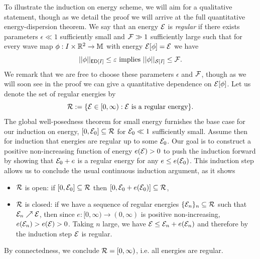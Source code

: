 To illustrate the induction on energy scheme, we will aim for a qualitative statement, though as we detail the proof we will arrive at the full quantitative energy-dispersion theorem. We say that an energy $\mathcal E$ is \emph{regular} if there exists parameters $\epsilon \ll 1$ sufficiently small and $\mathcal F \gg 1$ sufficiently large such that for every wave map $\phi : I \times \mathbb R^2 \to \mathbb M$ with energy $\mathcal E [\phi] = \mathcal E$ we have
	\[ ||\phi||_{\mathsf{ED} [I]} \leq \varepsilon \text{ implies } || \phi||_{\mathcal S[I]} \leq \mathcal F. \]
We remark that we are free to choose these parameters $\epsilon$ and $\mathcal F$, though as we will soon see in the proof we can give a quantitative dependence on $\mathcal E[\phi]$. Let us denote the set of regular energies by 
	\[ \mathcal R := \{ \mathcal E \in [0, \infty) : \text{$\mathcal E$ is a regular energy} \}. \]
The global well-posedness theorem for small energy furnishes the base case for our induction on energy, $[0, \mathcal E_0] \subseteq \mathcal R$ for $\mathcal E_0 \ll 1$ sufficiently small. Assume then for induction that energies are regular up to some $\mathcal E_0$. Our goal is to construct a positive non-increasing function of energy $e (\mathcal E) > 0$ to push the induction forward by showing that $\mathcal E_0 + e$ is a regular energy for any $e \leq e (\mathcal E_0)$. This induction step allows us to conclude the usual continuous induction argument, as it shows
	\begin{itemize}
		\item $\mathcal R$ is open: if $[0, \mathcal E_0] \subseteq \mathcal R$ then $[0, \mathcal E_0 + e(\mathcal E_0)] \subseteq \mathcal R$, 
		\item $\mathcal R$ is closed: if we have a sequence of regular energies $\{ \mathcal E_n \}_n \subseteq \mathcal R$ such that $\mathcal E_n \nearrow \mathcal E$, then since $e :[0, \infty) \to (0, \infty)$ is positive non-increasing, $e(\mathcal E_n) > e(\mathcal E) > 0$. Taking $n$ large, we have $\mathcal E \leq \mathcal E_n + e(\mathcal E_n)$ and therefore by the induction step $\mathcal E$ is regular. 
	\end{itemize}
By connectedness, we conclude $\mathcal R = [0, \infty)$, i.e. all energies are regular. 

